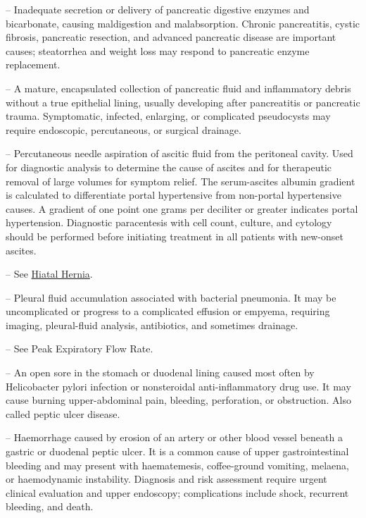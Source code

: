 -- Inadequate secretion or delivery of pancreatic digestive enzymes and bicarbonate, causing maldigestion and malabsorption. Chronic pancreatitis, cystic fibrosis, pancreatic resection, and advanced pancreatic disease are important causes; steatorrhea and weight loss may respond to pancreatic enzyme replacement.

-- A mature, encapsulated collection of pancreatic fluid and inflammatory debris without a true epithelial lining, usually developing after pancreatitis or pancreatic trauma. Symptomatic, infected, enlarging, or complicated pseudocysts may require endoscopic, percutaneous, or surgical drainage.

-- Percutaneous needle aspiration of ascitic fluid from the peritoneal cavity. Used for diagnostic analysis to determine the cause of ascites and for therapeutic removal of large volumes for symptom relief. The serum-ascites albumin gradient is calculated to differentiate portal hypertensive from non-portal hypertensive causes. A gradient of one point one grams per deciliter or greater indicates portal hypertension. Diagnostic paracentesis with cell count, culture, and cytology should be performed before initiating treatment in all patients with new-onset ascites.

-- See \hyperlink{Hiatal Hernia}{Hiatal Hernia}.

-- Pleural fluid accumulation associated with bacterial pneumonia. It may be uncomplicated or progress to a complicated effusion or empyema, requiring imaging, pleural-fluid analysis, antibiotics, and sometimes drainage.

-- See Peak Expiratory Flow Rate.

-- An open sore in the stomach or duodenal lining caused most often by Helicobacter pylori infection or nonsteroidal anti-inflammatory drug use. It may cause burning upper-abdominal pain, bleeding, perforation, or obstruction. Also called peptic ulcer disease.

-- Haemorrhage caused by erosion of an artery or other blood vessel beneath a gastric or duodenal peptic ulcer. It is a common cause of upper gastrointestinal bleeding and may present with haematemesis, coffee-ground vomiting, melaena, or haemodynamic instability. Diagnosis and risk assessment require urgent clinical evaluation and upper endoscopy; complications include shock, recurrent bleeding, and death.

